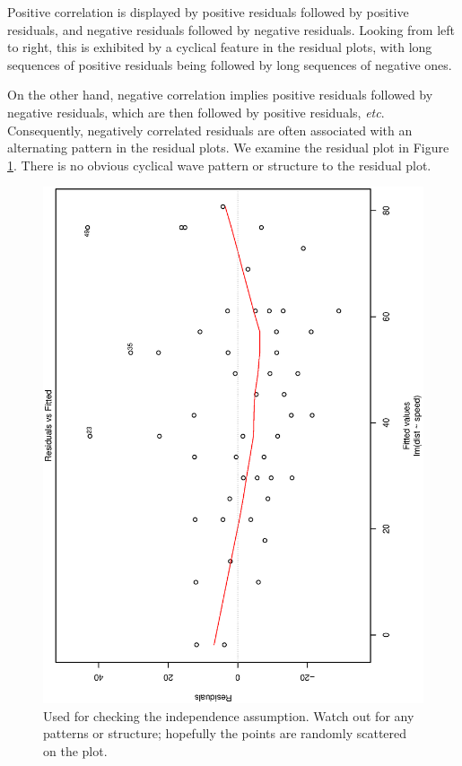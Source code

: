 \documentclass[captions=tableheading]{scrbook}
\begin{document}
Positive correlation is displayed by positive residuals followed by positive residuals, and negative residuals followed by negative residuals. Looking from left to right, this is exhibited by a cyclical feature in the residual plots, with long sequences of positive residuals being followed by long sequences of negative ones.

On the other hand, negative correlation implies positive residuals followed by negative residuals, which are then followed by positive residuals, \emph{etc}. Consequently, negatively correlated residuals are often associated with an alternating pattern in the residual plots. We examine the residual plot in Figure \ref{fig-resids-fitted-cars}. There is no obvious cyclical wave pattern or structure to the residual plot. 

\begin{figure}[th]
  \includegraphics[angle=270, totalheight=4in]{ps/slr/resids-fitted-cars.ps}
  \caption[Plot of the residuals versus the fitted values for the \texttt{cars}
data]{\small Used for checking the independence assumption. Watch out for any patterns or structure; hopefully the points are randomly scattered on the plot.}
  \label{fig-resids-fitted-cars}
\end{figure}
\end{document}
